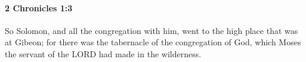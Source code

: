 
		\paragraph{2 Chronicles 1:3} %
			\label{2CHRONICLES-1-3}

			So Solomon, and all the congregation with him, went to the high place that was at Gibeon; for there was the tabernacle of the congregation of God, which Moses the servant of the LORD had made in the wilderness.


